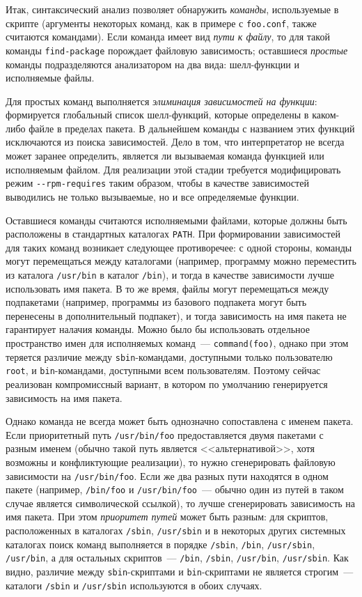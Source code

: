 \documentclass[russian,a4paper,12pt,titlepage]{article}
\begin{document}
Итак, синтаксический анализ позволяет обнаружить \textit{команды}, используемые в скрипте (аргументы некоторых команд,
как в примере с \verb|foo.conf|, также считаются командами).  Если команда имеет вид \textit{пути к файлу}, то для такой команды
\verb|find-package| порождает файловую зависимость; оставшиеся \textit{простые} команды подразделяются анализатором
на два вида: шелл-функции и исполняемые файлы.

Для простых команд выполняется \textit{элиминация зависимостей на функции}: формируется глобальный список шелл-функций,
которые определены в каком-либо файле в пределах пакета.  В дальнейшем команды с названием этих функций исключаются
из поиска зависимостей.  Дело в том, что интерпретатор не всегда может заранее определить, является ли вызываемая
команда функцией или исполняемым файлом.  Для реализации этой стадии требуется модифицировать режим \verb|--rpm-requires|
таким образом, чтобы в качестве зависимостей выводились не только вызываемые, но и все определяемые функции.

Оставшиеся команды считаются исполняемыми файлами, которые должны быть расположены в стандартных каталогах \verb|PATH|.
При формировании зависимостей для таких команд возникает следующее противоречее: с одной стороны, команды могут
перемещаться между каталогами (например, программу можно переместить из каталога \verb|/usr/bin| в каталог \verb|/bin|),
и тогда в качестве зависимости лучше использовать имя пакета.  В то же время, файлы могут перемещаться между
подпакетами (например, программы из базового подпакета могут быть перенесены в дополнительный подпакет), и тогда
зависимость на имя пакета не гарантирует налачия команды.  Можно было бы использовать отдельное пространство имен
для исполняемых команд~--- \verb|command(foo)|, однако при этом теряется различие между \verb|sbin|-командами,
доступными только пользователю \verb|root|, и \verb|bin|-командами, доступными всем пользователям.  Поэтому
сейчас реализован компромиссный вариант, в котором по умолчанию генерируется зависимость на имя пакета.

Однако команда не всегда может быть однозначно сопоставлена с именем пакета.  Если приоритетный путь \verb|/usr/bin/foo|
предоставляется двумя пакетами с разным именем (обычно такой путь является <<альтернативой>>, хотя возможны и конфликтующие
реализации), то нужно сгенерировать файловую зависимости на \verb|/usr/bin/foo|.  Если же два разных пути находятся
в одном пакете (например, \verb|/bin/foo| и \verb|/usr/bin/foo|~--- обычно один из путей в таком случае является символической
ссылкой), то лучше сгенерировать зависимость на имя пакета.  При этом \textit{приоритет путей} может быть разным: для скриптов,
расположенных в каталогах \verb|/sbin|, \verb|/usr/sbin| и в некоторых других системных каталогах поиск команд выполняется
в порядке
\verb|/sbin|, \verb|/bin|, \verb|/usr/sbin|, \verb|/usr/bin|,
а для остальных скриптов~---
\verb|/bin|, \verb|/sbin|, \verb|/usr/bin|, \verb|/usr/sbin|.
Как видно, различие между \verb|sbin|-скриптами и \verb|bin|-скриптами не является строгим~---
каталоги \verb|/sbin| и \verb|/usr/sbin| используются в обоих случаях.
\end{document}
